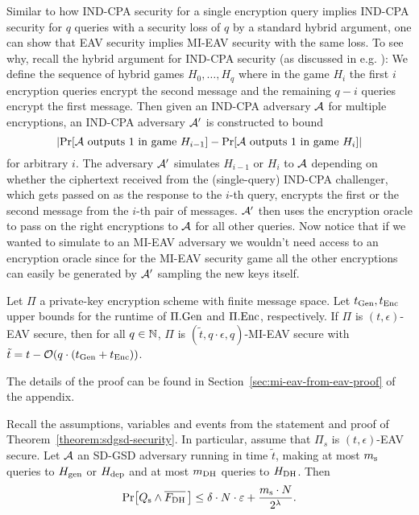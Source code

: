 Similar to how IND-CPA security for a single encryption query implies IND-CPA security for $q$ queries with a security loss of $q$ by a standard hybrid argument, one can show that EAV security implies MI-EAV security with the same loss. To see why, recall the hybrid argument for IND-CPA security (as discussed in e.g. \cite[Theorem 12.6]{introduction-to-modern-cryptography}): We define the sequence of hybrid games $H_0, \ldots, H_q$ where in the game $H_i$ the first $i$ encryption queries encrypt the second message and the remaining $q - i$ queries encrypt the first message. Then given an IND-CPA adversary $\mathcal{A}$ for multiple encryptions, an IND-CPA adversary $\mathcal{A}'$ is constructed to bound
\[
	\abs*{\pr{\adv \text{ outputs } 1 \text{ in game } H_{i - 1}} - \pr{\adv \text{ outputs } 1 \text{ in game } H_{i}}}
\]
for arbitrary $i$.
The adversary $\mathcal{A}'$ simulates $H_{i - 1}$ or $H_{i}$ to $\mathcal{A}$ depending on whether the ciphertext received from the (single-query) IND-CPA challenger, which gets passed on as the response to the $i$-th query, encrypts the first or the second message from the $i$-th pair of messages. $\mathcal{A}'$ then uses the encryption oracle to pass on the right encryptions to $\mathcal{A}$ for all other queries. Now notice that if we wanted to simulate to an MI-EAV adversary we wouldn't need access to an encryption oracle since for the MI-EAV security game all the other encryptions can easily be generated by $\mathcal{A}'$ sampling the new keys itself.

\begin{lemma} \label{lemma:mi-eav-from-eav}
	Let $\Pi$ a private-key encryption scheme with finite message space. Let $t_{\mathrm{Gen}}, t_{\mathrm{Enc}}$ upper bounds for the runtime of $\Pi.\mathrm{Gen}$ and $\Pi.\mathrm{Enc}$, respectively. If $\Pi$ is $(t, \epsilon)$-EAV secure, then for all $q \in \mathbb{N}$, $\Pi$ is $(\tilde{t}, q \cdot \epsilon, q)$-MI-EAV secure with $\tilde{t} = t - \mathcal{O}(q \cdot (t_{\mathrm{Gen}} + t_{\mathrm{Enc}}))$.
\end{lemma}

The details of the proof can be found in Section~\ref{sec:mi-eav-from-eav-proof} of the appendix.

\begin{lemma} \label{lemma:eav-reduction}
	Recall the assumptions, variables and events from the statement and proof of Theorem~\ref{theorem:sdgsd-security}. In particular, assume that $\Pi_s$ is $(t, \epsilon)$-EAV secure. Let $\mathcal{A}$ an SD-GSD adversary running in time $\tilde{t}$, making at most $m_\mathrm{s}$ queries to $H_\mathrm{gen}$ or $H_\mathrm{dep}$ and at most $m_\mathrm{DH}$ queries to $H_\mathrm{DH}$. Then
	\[
		\pr{\qs \land \overline{\fdh}\,} \le \delta \cdot N \cdot \epsilon + \frac{\ms \cdot N}{2^\lambda}.
	\]
\end{lemma}

